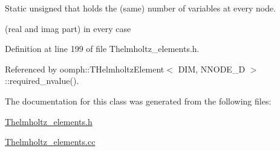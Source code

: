 Static unsigned that holds the (same) number of variables at every node. 

(real and imag part) in every case 

Definition at line 199 of file Thelmholtz\+\_\+elements.\+h.



Referenced by oomph\+::\+T\+Helmholtz\+Element$<$ D\+I\+M, N\+N\+O\+D\+E\+\_\+D $>$\+::required\+\_\+nvalue().



The documentation for this class was generated from the following files\+:\begin{DoxyCompactItemize}
\item 
\hyperlink{Thelmholtz__elements_8h}{Thelmholtz\+\_\+elements.\+h}\item 
\hyperlink{Thelmholtz__elements_8cc}{Thelmholtz\+\_\+elements.\+cc}\end{DoxyCompactItemize}
